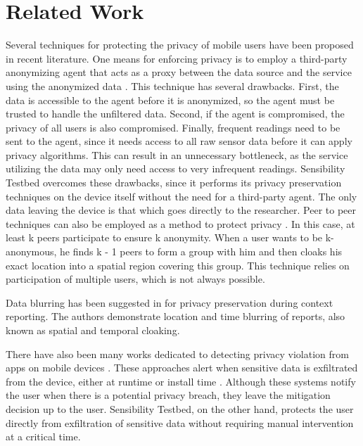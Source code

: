 \section{Related Work}\label{sec-related}

Several techniques for protecting the privacy of mobile users have
been proposed in recent literature. One means for enforcing privacy is
to employ a third-party anonymizing agent that acts as a proxy between
the data source and the service using the anonymized data
\cite{gruteser2003anonymous, mokbel2006new}. This technique has
several drawbacks. First, the data is accessible to the agent before it is anonymized, 
so the agent must be trusted to handle the unfiltered data. Second, if
the agent is compromised, the privacy of all users is also
compromised. Finally, frequent readings need to be sent to the agent,
since it needs access to all raw sensor data before it can apply
privacy algorithms. This can result in an unnecessary bottleneck, as
the service utilizing the data may only need access to very infrequent
readings. Sensibility Testbed overcomes these drawbacks, since it
performs its privacy preservation techniques on the device itself
without the need for a third-party agent. The only data leaving the
device is that which goes directly to the researcher. Peer to peer techniques 
can also be employed as a method to protect privacy \cite{ghinita2007mobihide}. In this case, 
at least k peers participate to ensure k anonymity. When a user wants 
to be k-anonymous, he finds k - 1 peers to form a group with him and then 
cloaks his exact location into a spatial region covering this group. This technique relies 
on participation of multiple users, which is not always possible.

Data blurring has been suggested in \cite{kapadia2008anonysense} for
privacy preservation during context reporting. The authors demonstrate
location and time blurring of reports, also known as spatial and
temporal cloaking. 

There have also been many works dedicated to detecting privacy
violation from apps on mobile devices \cite{chakraborty2014ipshield,
enck2014taintdroid, holavanalli2013flow}. These approaches alert when
sensitive data is exfiltrated from the device, either at runtime
\cite{chakraborty2014ipshield, enck2014taintdroid} or install time
\cite{holavanalli2013flow}. Although
these systems notify the user when there is a potential privacy
breach, they leave the mitigation decision up to the user. Sensibility
Testbed, on the other hand, protects the user directly from
exfiltration of sensitive data without requiring manual intervention
at a critical time.
 
